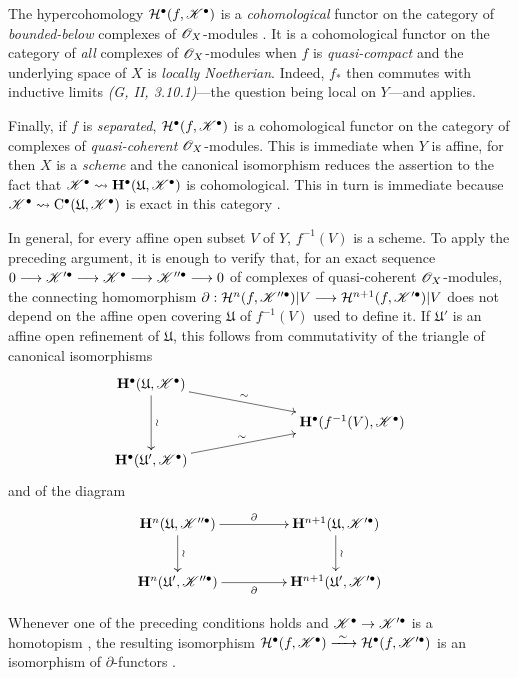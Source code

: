 \begin{env}[6.2.6]
\label{III.6.2.6}
The hypercohomology
$\mathcal{H}^\bullet(f,\mathscr{K}^\bullet)$ is a \emph{cohomological} functor
on the category of \emph{bounded-below} complexes of $\mathscr{O}_X$-modules
.  It is a cohomological functor on the category
of \emph{all} complexes of $\mathscr{O}_X$-modules when $f$ is \emph{quasi-compact}
and the underlying space of $X$ is \emph{locally Noetherian}.  Indeed,
$f_*$ then commutes with inductive limits
\emph{(G, II, 3.10.1)}---the question being local on $Y$---and
 applies.

Finally, if $f$ is \emph{separated},
$\mathcal{H}^\bullet(f,\mathscr{K}^\bullet)$ is a cohomological functor
on the category of complexes of \emph{quasi-coherent}
$\mathscr{O}_X$-modules.  This is immediate when $Y$ is affine, for
then $X$ is a \emph{scheme} and the canonical isomorphism
 reduces the assertion to the fact that $\mathscr{K}^\bullet\leadsto
\mathbf{H}^\bullet(\mathfrak{U},\mathscr{K}^\bullet)$
is cohomological.  This in turn is immediate because $\mathscr{K}^\bullet\leadsto
\mathrm{C}^\bullet(\mathfrak{U},\mathscr{K}^\bullet)$
is exact in this category .

In general, for every affine open subset $V$ of $Y$,
$f^{-1}(V)$ is a scheme.  To apply the preceding argument, it is
enough to verify that, for an exact sequence $0\longrightarrow\mathscr{K}'^\bullet
\longrightarrow\mathscr{K}^\bullet
\longrightarrow\mathscr{K}''^\bullet
\longrightarrow0$
of complexes of quasi-coherent $\mathscr{O}_X$-modules, the connecting
homomorphism $\partial:
\mathcal{H}^n(f,\mathscr{K}''^\bullet)|V
\longrightarrow
\mathcal{H}^{n+1}(f,\mathscr{K}'^\bullet)|V$
does not depend on the affine open covering $\mathfrak{U}$ of
$f^{-1}(V)$ used to define it.  If $\mathfrak{U}'$ is an affine
open refinement of $\mathfrak{U}$, this follows from commutativity
of the triangle of canonical isomorphisms
\[
  \xymatrix@C=34pt@R=11pt{
    \mathbf{H}^\bullet(\mathfrak{U},\sh{K}^\bullet)
      \ar[rrd]^-{\sim}
      \ar[dd]^{\wr}
    && \\
    &&
    \mathbf{H}^\bullet(f^{-1}(V),\sh{K}^\bullet)
    \\
    \mathbf{H}^\bullet(\mathfrak{U}',\sh{K}^\bullet)
      \ar[rru]^-{\sim}
    &&
  }
\]
and of the diagram
\[
  \xymatrix@C=46pt@R=25pt{
    \mathbf{H}^n(\mathfrak{U},\sh{K}''^\bullet)
      \ar[r]^-{\partial}
      \ar[d]^{\wr}
    &
    \mathbf{H}^{n+1}(\mathfrak{U},\sh{K}'^\bullet)
      \ar[d]^{\wr}
    \\
    \mathbf{H}^n(\mathfrak{U}',\sh{K}''^\bullet)
      \ar[r]_-{\partial}
    &
    \mathbf{H}^{n+1}(\mathfrak{U}',\sh{K}'^\bullet)
  }
\]

Whenever one of the preceding conditions holds and
$\mathscr{K}^\bullet\to\mathscr{K}'^\bullet$ is a homotopism
, the resulting isomorphism $\mathcal{H}^\bullet(f,\mathscr{K}^\bullet)
\xrightarrow{\ \sim\ }
\mathcal{H}^\bullet(f,\mathscr{K}'^\bullet)$
is an isomorphism of $\partial$-functors
.
\end{env}

